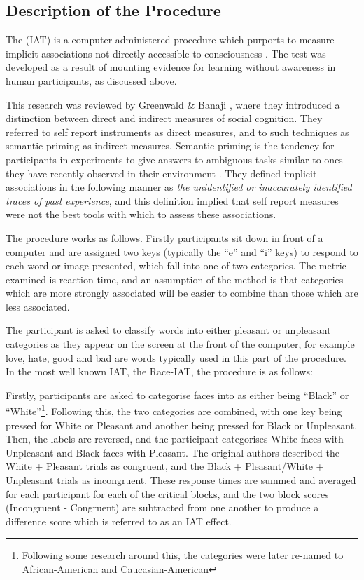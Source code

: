 \subsection{Description of the Procedure}
\label{sec:descr-proc}

The (IAT) is a computer administered procedure which purports to measure implicit associations not directly accessible to consciousness \cite{Greenwald1998}. The test was developed as a result of mounting evidence for learning without awareness in human participants, as discussed above. 

This research was reviewed by Greenwald \& Banaji \cite{Greenwald1995a}, where they introduced a distinction between direct and indirect measures of social cognition. They referred to self report instruments as direct measures, and to such techniques as semantic priming as indirect measures. Semantic priming is the tendency for participants in experiments to give answers to ambiguous tasks similar to ones they have recently observed in their environment \cite{Wittenbrink2007}.  They defined implicit associations in the following manner as \textit{the unidentified or inaccurately identified traces of past experience}, and this definition implied that self report measures were not the best tools with which to assess these associations. 

The procedure works as follows. Firstly participants sit down in front of a computer and are assigned two keys (typically the ``e'' and ``i'' keys) to respond to each word or image presented, which fall into one of two categories. The metric examined is reaction time, and an assumption of the method is that categories which are more strongly associated will be easier to combine than those which are less associated.  

The participant is asked to classify words into either pleasant or unpleasant categories as they appear on the screen at the front of the computer, for example love, hate, good  and bad are words typically used in this part of the procedure. In the most well known IAT, the Race-IAT, the procedure is as follows:

Firstly, participants are asked to categorise faces into as either being ``Black'' or ``White''\footnote{Following some research around this, the categories were later re-named to African-American and Caucasian-American}.
 Following this, the two categories are combined, with one key being pressed for White or Pleasant and another being pressed for Black or Unpleasant. Then, the labels are reversed, and the participant categorises White faces with Unpleasant and Black faces with Pleasant. The original authors described the White + Pleasant trials as congruent, and the Black + Pleasant/White + Unpleasant trials as incongruent.  These response times are summed and averaged for each participant for each of the critical blocks, and the two block scores (Incongruent - Congruent) are subtracted from one another to produce a difference score which is referred to as an IAT effect. 

